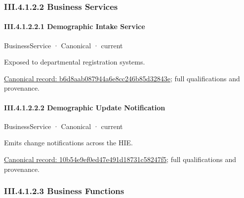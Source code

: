 \subsubsection*{III.4.1.2.2 Business Services}
\label{navigation:III.4.1.2.2}

\paragraph*{III.4.1.2.2.1 Demographic Intake Service}
\label{navigation:III.4.1.2.2.1}

\label{element:b6d8aab087944a6e8cc246b85d32843e}
{\small BusinessService · Canonical · current}\par

Exposed to departmental registration systems.


{\footnotesize \href{../../../../../../../continuum/business/business-service/b6d8aab087944a6e8cc246b85d32843e.md}{Canonical record: b6d8aab087944a6e8cc246b85d32843e}; full qualifications and provenance.}\par
\paragraph*{III.4.1.2.2.2 Demographic Update Notification}
\label{navigation:III.4.1.2.2.2}

\label{element:10b54e9ef0ed47e491d18731c58247f5}
{\small BusinessService · Canonical · current}\par

Emits change notifications across the HIE.


{\footnotesize \href{../../../../../../../continuum/business/business-service/10b54e9ef0ed47e491d18731c58247f5.md}{Canonical record: 10b54e9ef0ed47e491d18731c58247f5}; full qualifications and provenance.}\par
\subsubsection*{III.4.1.2.3 Business Functions}
\label{navigation:III.4.1.2.3}

